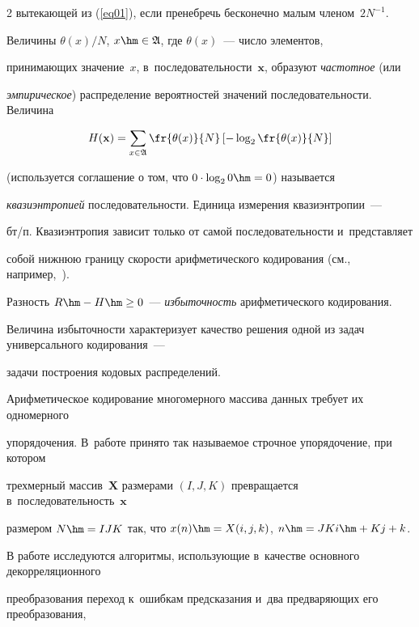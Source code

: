 \begin{multicols}{2}
вытекающей из (\ref{eq01}), если пренебречь бесконечно малым членом~$2N^{-1}$.



Величины $\theta(x)/N$, $x\hm\in\mathfrak{A}$, где $\theta(x)$~--- число элементов,

 принимающих значение~$x$, в~последовательности~$\mathbf{x}$, образуют \textit{частотное} (или 

 \textit{эмпирическое}) распределение вероятностей значений последовательности. Величина

\begin{equation}

\label{eq04}

H(\mathbf{x}) =  \sum\limits_{x\in\mathfrak{A}}

\fr{\theta(x)}{N} \left[ -\log_2 \fr{\theta(x)}{N}\right]

\end{equation}

(используется соглашение о том, что $0\cdot\log_20\hm=0$) называется 

\textit{квазиэнтропией} по\-сле\-до\-ва\-тель\-ности. Единица измерения квазиэнтропии~--- 

бт/п. Квазиэнтропия зависит только от самой последовательности и~представляет 

собой нижнюю границу скорости арифметического кодирования (см., например,~\cite{b4}). 

Разность $R\hm-H\hm\ge 0$~--- \textit{избыточность} арифметического кодирования. 

Величина избыточности характеризует качество решения одной из задач универсального кодирования~--- 

задачи построения кодовых распределений.



Арифметическое кодирование многомерного массива данных требует их одномерного 

упорядочения. В~работе принято так называемое \mbox{строчное} упорядочение, при котором 

трехмерный массив~$\mathbf{X}$ размерами $(I,J,K)$ превращается в~последовательность~$\mathbf{x}$   

размером $N\hm= I J K$ так, что $x(n)\hm=X(i,j,k)$, $n\hm=J K i \hm+ K j +k$.



В работе исследуются алгоритмы, ис\-поль\-зу\-ющие в~качестве основного декорреляционного 

преобразования переход к~ошибкам предсказания и~два предваряющих его преобразования, 


\end{multicols}
